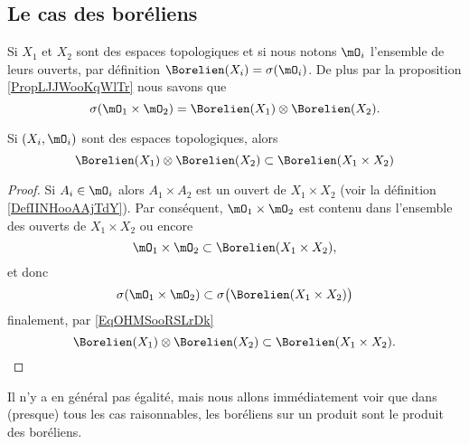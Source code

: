 \subsection{Le cas des boréliens}

Si \( X_1\) et  \( X_2\) sont des espaces topologiques et si nous notons \( \mO_i\) l'ensemble de leurs ouverts, par définition \( \Borelien(X_i)=\sigma(\mO_i)\). De plus par la proposition \ref{PropLJJWooKqWlTr} nous savons que
\begin{equation}        \label{EqOHMSooRSLrDk}
    \sigma(\mO_1\times \mO_2)=\Borelien(X_1)\otimes \Borelien(X_2).
\end{equation}

\begin{lemma}       \label{LemDEDQooJyzXgC}
    Si \( (X_i,\mO_i)\) sont des espaces topologiques, alors
    \begin{equation}
        \Borelien(X_1)\otimes \Borelien(X_2)\subset \Borelien(X_1\times X_2)
    \end{equation}
\end{lemma}

\begin{proof}
    Si \( A_i\in \mO_i\) alors \( A_1\times A_2\) est un ouvert de \( X_1\times X_2\) (voir la définition \ref{DefIINHooAAjTdY}). Par conséquent, \( \mO_1\times \mO_2\) est contenu dans l'ensemble des ouverts de \( X_1\times X_2\) ou encore
    \begin{equation}
        \mO_1\times \mO_2\subset\Borelien(X_1\times X_2),
    \end{equation}
    et donc
    \begin{equation}
        \sigma(\mO_1\times \mO_2)\subset\sigma\big( \Borelien(X_1\times X_2) \big)
    \end{equation}
    finalement, par \eqref{EqOHMSooRSLrDk}
    \begin{equation}
        \Borelien(X_1)\otimes\Borelien(X_2)\subset\Borelien(X_1\times X_2).
    \end{equation}
\end{proof}

Il n'y a en général pas égalité, mais nous allons immédiatement voir que dans (presque) tous les cas raisonnables, les boréliens sur un produit sont le produit des boréliens.

